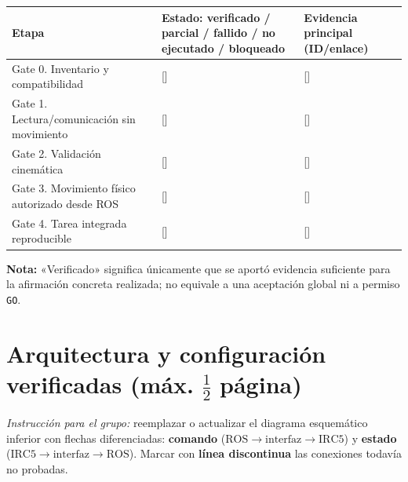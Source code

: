 \documentclass[10pt, a4paper]{article}
\newcommand{\campo}[1]{{\ttfamily\small[#1]}}
\begin{document}
\begingroup
\footnotesize
\setlength{\tabcolsep}{4pt}
\renewcommand{\arraystretch}{1.35}
\noindent\begin{tabularx}{\textwidth}{|>{\hsize=1.05\hsize\raggedright\arraybackslash}X|>{\hsize=1.10\hsize\raggedright\arraybackslash}X|>{\hsize=0.85\hsize\raggedright\arraybackslash}X|}
\hline
\rowcolor{ucbblue!15}
\textbf{Etapa} & \textbf{Estado: verificado / parcial / fallido / no ejecutado / bloqueado} & \textbf{Evidencia principal (ID/enlace)} \\ \hline
Gate 0. Inventario y compatibilidad & \campo{\quad} & \campo{\quad} \\ \hline
Gate 1. Lectura/comunicación sin movimiento & \campo{\quad} & \campo{\quad} \\ \hline
Gate 2. Validación cinemática & \campo{\quad} & \campo{\quad} \\ \hline
Gate 3. Movimiento físico autorizado desde ROS & \campo{\quad} & \campo{\quad} \\ \hline
Gate 4. Tarea integrada reproducible & \campo{\quad} & \campo{\quad} \\ \hline
\end{tabularx}
\endgroup

\vspace{2pt}
{\footnotesize\textbf{Nota:} «Verificado» significa únicamente que se aportó evidencia suficiente para la afirmación concreta realizada; no equivale a una aceptación global ni a permiso \texttt{GO}.}

\section{Arquitectura y configuración verificadas \texorpdfstring{{\small\normalfont(máx. $\frac{1}{2}$ página)}}{(máx. 1/2 página)}}

\textit{Instrucción para el grupo:} reemplazar o actualizar el diagrama esquemático inferior con flechas diferenciadas: \textbf{comando} ($\text{ROS} \to \text{interfaz} \to \text{IRC5}$) y \textbf{estado} ($\text{IRC5} \to \text{interfaz} \to \text{ROS}$). Marcar con \textbf{línea discontinua} las conexiones todavía no probadas.
\end{document}
